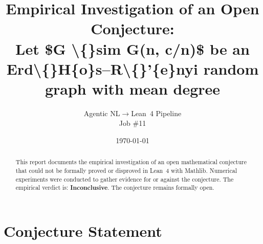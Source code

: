 \documentclass[11pt]{article}
\title{Empirical Investigation of an Open Conjecture:\\
Let \$G \textbackslash\{\}sim G(n, c/n)\$ be an Erd\textbackslash\{\}H\{o\}s--R\textbackslash\{\}'\{e\}nyi random graph with mean degree }
\author{Agentic NL$\to$Lean~4 Pipeline \\ \small Job \#11}
\date{\today}
\begin{document}
\maketitle

\begin{abstract}
This report documents the empirical investigation of an open mathematical conjecture
that could not be formally proved or disproved in Lean~4 with Mathlib.
Numerical experiments were conducted to gather evidence for or against the conjecture.
The empirical verdict is: \textbf{\textcolor{orange!80!black}{Inconclusive}}.
The conjecture remains formally open.
\end{abstract}

\section{Conjecture Statement}
\end{document}
